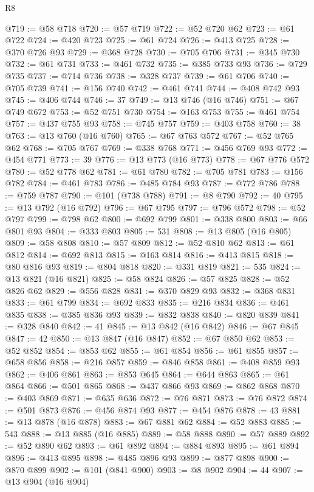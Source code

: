 \begin{lexlean}{R8}
\begin{coremodule}
@719 := @58 @718
@720 := @57 @719
@722 := @52 @720 @62
@723 := @61 @722
@724 := @420 @723
@725 := @61 @724
@726 := @413 @725
@728 := @370 @726 @93
@729 := @368 @728
@730 := @705 @706
@731 := @345 @730
@732 := @61 @731
@733 := @461 @732
@735 := @385 @733 @93
@736 := @729 @735
@737 := @714 @736
@738 := @328 @737
@739 := @61 @706
@740 := @705 @739
@741 := @156 @740
@742 := @461 @741
@744 := @408 @742 @93
@745 := @406 @744
@746 := 37
@749 := @13 @746 (@16 @746)
@751 := @67 @749 @672
@753 := @52 @751 @730
@754 := @163 @753
@755 := @461 @754
@757 := @437 @755 @93
@758 := @745 @757
@759 := @403 @758
@760 := 38
@763 := @13 @760 (@16 @760)
@765 := @67 @763 @572
@767 := @52 @765 @62
@768 := @705 @767
@769 := @338 @768
@771 := @456 @769 @93
@772 := @454 @771
@773 := 39
@776 := @13 @773 (@16 @773)
@778 := @67 @776 @572
@780 := @52 @778 @62
@781 := @61 @780
@782 := @705 @781
@783 := @156 @782
@784 := @461 @783
@786 := @485 @784 @93
@787 := @772 @786
@788 := @759 @787
@790 := @101 (@738 @788)
@791 := @8 @790
@792 := 40
@795 := @13 @792 (@16 @792)
@796 := @67 @795
@797 := @796 @572
@798 := @52 @797
@799 := @798 @62
@800 := @692 @799
@801 := @338 @800
@803 := @66 @801 @93
@804 := @333 @803
@805 := 531
@808 := @13 @805 (@16 @805)
@809 := @58 @808
@810 := @57 @809
@812 := @52 @810 @62
@813 := @61 @812
@814 := @692 @813
@815 := @163 @814
@816 := @413 @815
@818 := @80 @816 @93
@819 := @804 @818
@820 := @331 @819
@821 := 535
@824 := @13 @821 (@16 @821)
@825 := @58 @824
@826 := @57 @825
@828 := @52 @826 @62
@829 := @556 @828
@831 := @370 @829 @93
@832 := @368 @831
@833 := @61 @799
@834 := @692 @833
@835 := @216 @834
@836 := @461 @835
@838 := @385 @836 @93
@839 := @832 @838
@840 := @820 @839
@841 := @328 @840
@842 := 41
@845 := @13 @842 (@16 @842)
@846 := @67 @845
@847 := 42
@850 := @13 @847 (@16 @847)
@852 := @67 @850 @62
@853 := @52 @852
@854 := @853 @62
@855 := @61 @854
@856 := @61 @855
@857 := @658 @856
@858 := @216 @857
@859 := @846 @858
@861 := @408 @859 @93
@862 := @406 @861
@863 := @853 @645
@864 := @644 @863
@865 := @61 @864
@866 := @501 @865
@868 := @437 @866 @93
@869 := @862 @868
@870 := @403 @869
@871 := @635 @636
@872 := @76 @871
@873 := @76 @872
@874 := @501 @873
@876 := @456 @874 @93
@877 := @454 @876
@878 := 43
@881 := @13 @878 (@16 @878)
@883 := @67 @881 @62
@884 := @52 @883
@885 := 543
@888 := @13 @885 (@16 @885)
@889 := @58 @888
@890 := @57 @889
@892 := @52 @890 @62
@893 := @61 @892
@894 := @884 @893
@895 := @61 @894
@896 := @413 @895
@898 := @485 @896 @93
@899 := @877 @898
@900 := @870 @899
@902 := @101 (@841 @900)
@903 := @8 @902
@904 := 44
@907 := @13 @904 (@16 @904)

\end{coremodule}
\end{lexlean}
